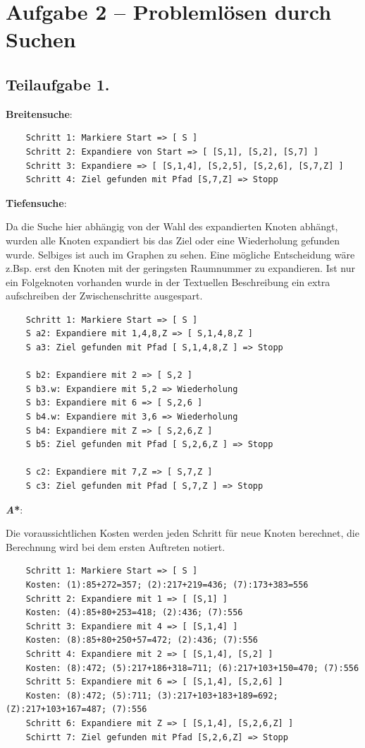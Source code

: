 \documentclass[
  a4paper,
  11pt,
]{scrartcl}
\begin{document}
\newpage

\section*{Aufgabe 2 -- Problemlösen durch Suchen}

\subsection*{Teilaufgabe 1.}

\textbf{Breitensuche}:

\begin{verbatim}
	Schritt 1: Markiere Start => [ S ]
	Schritt 2: Expandiere von Start => [ [S,1], [S,2], [S,7] ]
	Schritt 3: Expandiere => [ [S,1,4], [S,2,5], [S,2,6], [S,7,Z] ]
	Schritt 4: Ziel gefunden mit Pfad [S,7,Z] => Stopp
\end{verbatim}

\textbf{Tiefensuche}:

Da die Suche hier abhängig von der Wahl des expandierten Knoten abhängt, wurden alle Knoten expandiert bis das Ziel oder eine Wiederholung gefunden wurde. Selbiges ist auch im Graphen zu sehen. Eine mögliche Entscheidung wäre z.Bsp. erst den Knoten mit der geringsten Raumnummer zu expandieren. Ist nur ein Folgeknoten vorhanden wurde in der Textuellen Beschreibung ein extra aufschreiben der Zwischenschritte ausgespart.

\begin{verbatim}
	Schritt 1: Markiere Start => [ S ]
	S a2: Expandiere mit 1,4,8,Z => [ S,1,4,8,Z ]
	S a3: Ziel gefunden mit Pfad [ S,1,4,8,Z ] => Stopp
	
	S b2: Expandiere mit 2 => [ S,2 ]
	S b3.w: Expandiere mit 5,2 => Wiederholung
	S b3: Expandiere mit 6 => [ S,2,6 ]
	S b4.w: Expandiere mit 3,6 => Wiederholung
	S b4: Expandiere mit Z => [ S,2,6,Z ]
	S b5: Ziel gefunden mit Pfad [ S,2,6,Z ] => Stopp
	
	S c2: Expandiere mit 7,Z => [ S,7,Z ]
	S c3: Ziel gefunden mit Pfad [ S,7,Z ] => Stopp
\end{verbatim}

\textbf{\textit{A}*}:

Die voraussichtlichen Kosten werden jeden Schritt für neue Knoten berechnet, die Berechnung wird bei dem ersten Auftreten notiert.

\begin{verbatim}
	Schritt 1: Markiere Start => [ S ]
	Kosten: (1):85+272=357; (2):217+219=436; (7):173+383=556
	Schritt 2: Expandiere mit 1 => [ [S,1] ]
	Kosten: (4):85+80+253=418; (2):436; (7):556
	Schritt 3: Expandiere mit 4 => [ [S,1,4] ]
	Kosten: (8):85+80+250+57=472; (2):436; (7):556
	Schritt 4: Expandiere mit 2 => [ [S,1,4], [S,2] ]
	Kosten: (8):472; (5):217+186+318=711; (6):217+103+150=470; (7):556
	Schritt 5: Expandiere mit 6 => [ [S,1,4], [S,2,6] ]
	Kosten: (8):472; (5):711; (3):217+103+183+189=692; (Z):217+103+167=487; (7):556
	Schritt 6: Expandiere mit Z => [ [S,1,4], [S,2,6,Z] ]
	Schirtt 7: Ziel gefunden mit Pfad [S,2,6,Z] => Stopp
\end{verbatim}
\end{document}
